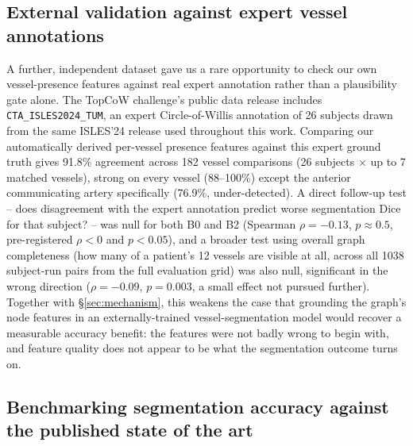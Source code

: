 \documentclass[conference]{IEEEtran}
\begin{document}
\subsection{External validation against expert vessel annotations}
\label{sec:topcowvalidation}

A further, independent dataset gave us a rare opportunity to check our own vessel-presence features against real expert annotation rather than a plausibility gate alone. The TopCoW challenge's public data release \cite{topcowbench2026} includes \texttt{CTA\_ISLES2024\_TUM}, an expert Circle-of-Willis annotation of 26 subjects drawn from the same ISLES'24 release used throughout this work. Comparing our automatically derived per-vessel presence features against this expert ground truth gives 91.8\% agreement across 182 vessel comparisons (26 subjects $\times$ up to 7 matched vessels), strong on every vessel (88--100\%) except the anterior communicating artery specifically (76.9\%, under-detected). A direct follow-up test -- does disagreement with the expert annotation predict worse segmentation Dice for that subject? -- was null for both B0 and B2 (Spearman $\rho=-0.13$, $p\approx0.5$, pre-registered $\rho<0$ and $p<0.05$), and a broader test using overall graph completeness (how many of a patient's 12 vessels are visible at all, across all 1038 subject-run pairs from the full evaluation grid) was also null, significant in the wrong direction ($\rho=-0.09$, $p=0.003$, a small effect not pursued further). Together with \S\ref{sec:mechanism}, this weakens the case that grounding the graph's node features in an externally-trained vessel-segmentation model would recover a measurable accuracy benefit: the features were not badly wrong to begin with, and feature quality does not appear to be what the segmentation outcome turns on.

\subsection{Benchmarking segmentation accuracy against the published state of the art}
\label{sec:benchmark}
\end{document}
